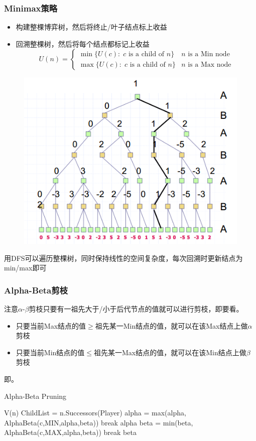\subsubsection{Minimax策略}
\begin{itemize}
	\item 构建整棵博弈树，然后将终止/叶子结点标上收益
	\item 回溯整棵树，然后将每个结点都标记上收益
\[U(n)=
\begin{cases}
\min\{U(c):\;c \text{ is a child of } n\} & n \text{ is a Min node}\\
\max\{U(c):\;c \text{ is a child of } n\} & n \text{ is a Max node}
\end{cases}\]
\end{itemize}
\begin{figure}[H]
\centering
\includegraphics[width=0.6\linewidth]{fig/game-tree.png}
\end{figure}

用DFS可以遍历整棵树，同时保持线性的空间复杂度，每次回溯时更新结点为min/max即可

\subsubsection{Alpha-Beta剪枝}
注意$\alpha$-$\beta$剪枝只要有一祖先大于/小于后代节点的值就可以进行剪枝，即要看。
\begin{itemize}
	\item 只要当前Max结点的值$\geq$祖先某一Min结点的值，就可以在该Max结点上做$\alpha$剪枝
	\item 只要当前Min结点的值$\leq$祖先某一Max结点的值，就可以在该Min结点上做$\beta$剪枝
\end{itemize}
即。
\begin{algorithm}[H]
\caption{Alpha-Beta Pruning}
\begin{algorithmic}[1]
\State \Return V(n)
\EndIf
\State ChildList = n.Successors(Player)
\State alpha = max(alpha, AlphaBeta(c,MIN,alpha,beta))
\State break
\EndIf
\EndFor
\State \Return alpha
\Else{}
\State beta = min(beta, AlphaBeta(c,MAX,alpha,beta))
\State break
\EndIf
\EndFor
\State \Return beta
\EndIf
\EndProcedure{}
\end{algorithmic}
\end{algorithm}

